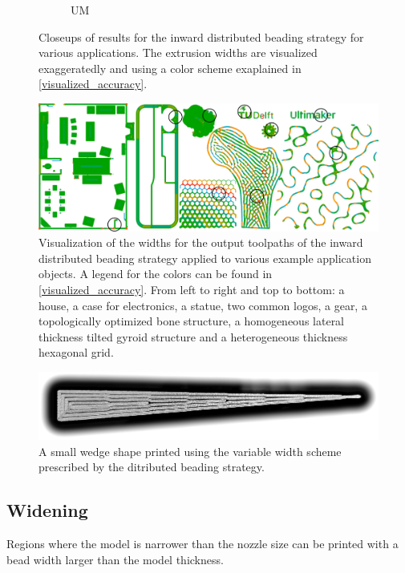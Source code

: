 \begin{figure}
\begin{subfigure}{\figwidth}
\caption{UM}%
\end{subfigure}
\caption{
Closeups of results for the inward distributed beading strategy for various applications.
The extrusion widths are visualized exaggeratedly and using a color scheme exaplained in \cref{visualized_accuracy}.
}
\label{application_closeups}
\end{figure}


\begin{figure}
\centering
\includegraphics[width=\columnwidth]{sources/applications/combined_small_dilated_circled.pdf}
\caption{
Visualization of the widths for the output toolpaths of the inward distributed beading strategy applied to various example application objects.
A legend for the colors can be found in \cref{visualized_accuracy}.
From left to right and top to bottom: a house, a case for electronics, a statue, two common logos, a gear, a topologically optimized bone structure, a homogeneous lateral thickness tilted gyroid structure and a heterogeneous thickness hexagonal grid.
}
\label{applications_overview}
\end{figure}


\begin{figure}
\centering
\includegraphics[width=\columnwidth]{sources/applications/wedge_print_v2.png}
\caption{
A small wedge shape printed using the variable width scheme prescribed by the ditributed beading strategy.
}
\label{wedge_print}
\end{figure}


\subsection{Widening}
Regions where the model is narrower than the nozzle size can be printed with a bead width larger than the model thickness.